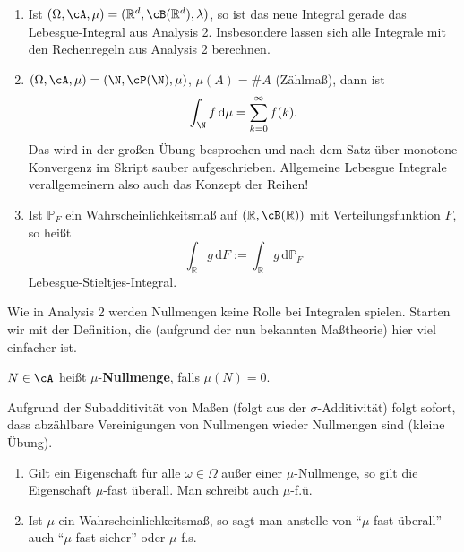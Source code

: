 \begin{beispiel}\label{bsp2}
	\begin{enumerate}[label=(\roman*)]
		\item Ist $(\Omega, \cA, \mu) = (\mathbb{R}^d, \cB(\mathbb{R}^d), \lambda)$, so ist das neue Integral  gerade das Lebesgue-Integral aus Analysis 2. Insbesondere lassen sich alle Integrale mit den Rechenregeln aus Analysis 2 berechnen.
		\item  $(\Omega, \cA, \mu) = (\N, \cP(\N), \mu)$, $\mu(A) = \#A$ (Zählmaß), dann ist 
		\begin{gather*}
			\int_{\N} f\, \mathrm{d}\mu = \sum\limits_{k=0}^{\infty} f(k).
		\end{gather*}
		Das wird in der gro\ss en \"Ubung besprochen und nach dem Satz \"uber monotone Konvergenz im Skript sauber aufgeschrieben. Allgemeine Lebesgue Integrale verallgemeinern also auch das Konzept der Reihen!
		\item Ist $\mathbb{P}_F$ ein Wahrscheinlichkeitsmaß auf $(\mathbb{R}, \cB(\mathbb{R}))$ mit Verteilungsfunktion $F$, so heißt 
		\[ \int_{\mathbb{R}} g \,\mathrm{d}F := \int_{\mathbb{R}} g\, \mathrm{d} \mathbb{P}_F \]
		Lebesgue-Stieltjes-Integral.
	\end{enumerate}
\end{beispiel}
Wie in Analysis 2 werden Nullmengen keine Rolle bei Integralen spielen. Starten wir mit der Definition, die (aufgrund der nun bekannten Ma\ss theorie) hier viel einfacher ist.
\begin{deff}
	$ N \in \cA$ heißt $ \mu $-\textbf{Nullmenge}, falls $ \mu (N) = 0$.
\end{deff}
Aufgrund der Subadditivit\"at von Ma\ss en (folgt aus der $\sigma$-Additivit\"at) folgt sofort, dass abz\"ahlbare Vereinigungen von Nullmengen wieder Nullmengen sind (kleine \"Ubung).


\begin{deff}
	\begin{enumerate}[label=(\roman*)]
		\item Gilt ein Eigenschaft für alle $\omega \in \Omega$ außer einer $\mu$-Nullmenge, so gilt die Eigenschaft $\mu$-fast überall. Man schreibt auch $\mu$-f.\"u.
		\item Ist $\mu$ ein Wahrscheinlichkeitsmaß, so sagt man anstelle von \enquote{$\mu$-fast überall} auch \enquote{$\mu$-fast sicher} oder $\mu$-f.s.
	\end{enumerate}
\end{deff}

